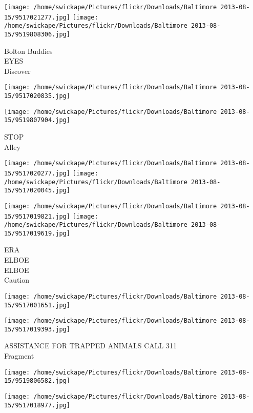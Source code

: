 \documentclass[10pt,letterpaper]{article}
\begin{document}
\vspace{0.25in}
\texttt{[image: /home/swickape/Pictures/flickr/Downloads/Baltimore 2013-08-15/9517021277.jpg]}
\texttt{[image: /home/swickape/Pictures/flickr/Downloads/Baltimore 2013-08-15/9519808306.jpg]}

Bolton Buddies\\
EYES\\
Discover\\
\pagebreak

\texttt{[image: /home/swickape/Pictures/flickr/Downloads/Baltimore 2013-08-15/9517020835.jpg]}

\vspace{0.25in}
\texttt{[image: /home/swickape/Pictures/flickr/Downloads/Baltimore 2013-08-15/9519807904.jpg]}

STOP\\
Alley\\
\pagebreak

\texttt{[image: /home/swickape/Pictures/flickr/Downloads/Baltimore 2013-08-15/9517020277.jpg]}
\texttt{[image: /home/swickape/Pictures/flickr/Downloads/Baltimore 2013-08-15/9517020045.jpg]}

\texttt{[image: /home/swickape/Pictures/flickr/Downloads/Baltimore 2013-08-15/9517019821.jpg]}
\texttt{[image: /home/swickape/Pictures/flickr/Downloads/Baltimore 2013-08-15/9517019619.jpg]}

ERA\\
ELBOE\\
ELBOE\\
Caution\\
\pagebreak

\texttt{[image: /home/swickape/Pictures/flickr/Downloads/Baltimore 2013-08-15/9517001651.jpg]}

\vspace{0.25in}
\texttt{[image: /home/swickape/Pictures/flickr/Downloads/Baltimore 2013-08-15/9517019393.jpg]}

ASSISTANCE FOR TRAPPED ANIMALS CALL 311\\
Fragment\\
\pagebreak

\texttt{[image: /home/swickape/Pictures/flickr/Downloads/Baltimore 2013-08-15/9519806582.jpg]}

\vspace{0.25in}
\texttt{[image: /home/swickape/Pictures/flickr/Downloads/Baltimore 2013-08-15/9517018977.jpg]}
\end{document}
